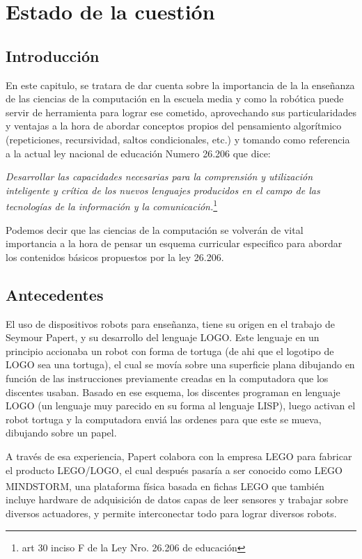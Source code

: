 \chapter{Estado de la cuestión}

\section{Introducción}

En este capitulo, se tratara de dar cuenta sobre la importancia de la la enseñanza de las ciencias de la computación en la escuela media y como la robótica puede servir de herramienta para lograr ese cometido, aprovechando sus particularidades y ventajas a la hora de abordar conceptos propios del pensamiento algorítmico (repeticiones, recursividad, saltos condicionales, etc.) y tomando como referencia a la actual ley nacional de educación Numero 26.206 que dice: 

\textit{Desarrollar  las  capacidades  necesarias  para  la  comprensión  y  utilización  inteligente  y  crítica  de  los  nuevos  lenguajes  producidos  en  el  campo  de  las tecnologías de la información y la comunicación.}\footnote{art 30 inciso F de la Ley Nro. 26.206 de educación}

Podemos decir que las ciencias de la computación \citep[pág 4]{sadosky2013cc} se volverán de vital importancia a la hora de pensar un esquema curricular especifico para abordar los contenidos básicos propuestos por la ley 26.206.

\section{Antecedentes}

El uso de dispositivos robots para enseñanza, tiene su origen en el trabajo de Seymour Papert, y su desarrollo del lenguaje LOGO. Este lenguaje en un principio accionaba un robot con forma de tortuga (de ahi que el logotipo de LOGO sea una tortuga), el cual se movía sobre una superficie plana dibujando en función de las instrucciones previamente creadas en la computadora que los discentes usaban. Basado en ese esquema, los discentes programan en lenguaje LOGO (un lenguaje muy parecido en su forma al lenguaje LISP), luego activan el robot tortuga y la computadora enviá las ordenes para que este se mueva, dibujando sobre un papel. 

A través de esa experiencia, Papert colabora con la empresa LEGO para fabricar el producto LEGO/LOGO, el cual después pasaría a ser conocido como LEGO MINDSTORM\textsuperscript{\texttrademark}, una plataforma física basada en fichas LEGO\textsuperscript{\textregistered} que también incluye hardware de adquisición de datos capas de leer sensores y trabajar sobre diversos actuadores, y permite interconectar todo para lograr diversos robots.

